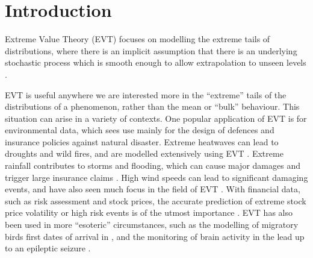 \documentclass{article}
\numberwithin{equation}{section}
\begin{document}
\section{Introduction}\label{sec:intro}


Extreme Value Theory (EVT) focuses on modelling the extreme tails of distributions, where there is an implicit assumption that there is an underlying stochastic process which is smooth enough to allow extrapolation to unseen levels \citep{Coles2001}.

EVT is useful anywhere we are interested more in the ``extreme'' tails of the distributions of a phenomenon, rather than the mean or ``bulk'' behaviour.
This situation can arise in a variety of contexts.
One popular application of EVT is for environmental data, which sees use mainly for the design of defences and insurance policies against natural disaster.
Extreme heatwaves can lead to droughts and wild fires, and are modelled extensively using EVT \citep{tanarhte2015heat, french2019quantifying, koh2023gradient}.
Extreme rainfall contributes to storms and flooding, which can cause major damages and trigger large insurance claims \citep{Rohrbeck_flooding, osei2021estimation}.
High wind speeds can lead to significant damaging events, and have also seen much focus in the field of EVT \citep{soukissian2015effect, steinkohl2013extreme}.
With financial data, such as risk assessment and stock prices, the accurate prediction of extreme stock price volatility or high risk events is of the utmost importance \citep{Furio2013, dridi2012monitoring}.
EVT has also been used in more ``esoteric'' circumstances, such as the modelling of migratory birds first dates of arrival in \citet{Koh2024}, and the monitoring of brain activity in the lead up to an epileptic seizure \citet{Karpov2022-xj}.
\end{document}
